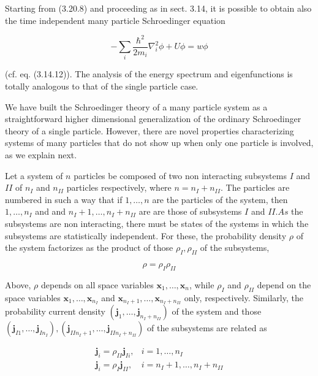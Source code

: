 \documentclass{article}
\begin{document}
Starting from (3.20.8) and proceeding as in sect. 3.14, it is possible to obtain also the time independent many particle Schroedinger equation
 
\begin{equation*}
-\sum_{i} \frac{\hbar^{2}}{2 m_{i}} \nabla_{i}^{2} \phi+U \phi=w \phi \tag{3.20.21}
\end{equation*}
 
(cf. eq. (3.14.12)). The analysis of the energy spectrum and eigenfunctions is totally analogous to that of the single particle case.

We have built the Schroedinger theory of a many particle system as a straightforward higher dimensional generalization of the ordinary Schroedinger theory of a single particle. However, there are novel properties characterizing systems of many particles that do not show up when only one particle is involved, as we explain next.

Let a system of $n$ particles be composed of two non interacting subsystems $I$ and $I I$ of $n_{I}$ and $n_{I I}$ particles respectively, where $n=n_{I}+n_{I I}$. The particles are numbered in such a way that if $1, \ldots, n$ are the particles of the system, then $1, \ldots, n_{I}$ and and $n_{I}+1, \ldots, n_{I}+n_{I I}$ are are those of subsystems $I$ and $I I . A s$ the subsystems are non interacting, there must be states of the systems in which the subsystems are statistically independent. For these, the probability density $\rho$ of the system factorizes as the product of those $\rho_{I}, \rho_{I I}$ of the subsystems,
 
\begin{equation*}
\rho=\rho_{I} \rho_{I I} \tag{3.20.22}
\end{equation*}
 

Above, $\rho$ depends on all space variables $\boldsymbol{x}_{1}, \ldots, \boldsymbol{x}_{n}$, while $\rho_{I}$ and $\rho_{I I}$ depend on the space variables $\boldsymbol{x}_{1}, \ldots, \boldsymbol{x}_{n_{I}}$ and $\boldsymbol{x}_{n_{I}+1}, \ldots, \boldsymbol{x}_{n_{I}+n_{I I}}$ only, respectively. Similarly, the probability current density $\left(\boldsymbol{j}_{1}, \ldots, \boldsymbol{j}_{n_{I}+n_{I I}}\right)$ of the system and those $\left(\boldsymbol{j}_{I 1}, \ldots, \boldsymbol{j}_{I n_{I}}\right),\left(\boldsymbol{j}_{I I n_{I}+1}, \ldots, \boldsymbol{j}_{I I n_{I}+n_{I I}}\right)$ of the subsystems are related as
 
\begin{align*}
\boldsymbol{j}_{i}=\rho_{I I} \boldsymbol{j}_{I i}, & i=1, \ldots, n_{I}  \tag{3.20.23}\\
\boldsymbol{j}_{i}=\rho_{I} \boldsymbol{j}_{I I}, & i=n_{I}+1, \ldots, n_{I}+n_{I I}
\end{align*}
 
\end{document}
